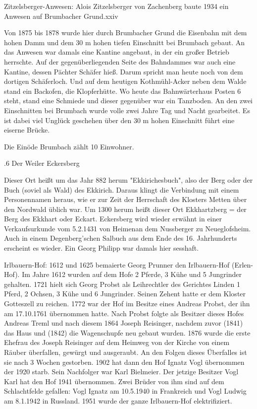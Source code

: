 Zitzelsberger-Anwesen: Alois Zitzelsberger von Zachenberg baute 1934 ein Anwesen
auf Brumbacher Grund.xxiv

Von 1875 bis 1878 wurde hier durch Brumbacher Grund die Eisenbahn mit dem hohen
Damm und dem 30 m hohen tiefen Einschnitt bei Brumbach gebaut. An das Anwesen
war damals eine Kantine angebaut, in der ein großer Betrieb herrschte. Auf der
gegenüberliegenden Seite des Bahndammes war auch eine Kantine, dessen Pächter
Schäfer hieß. Darum spricht man heute noch von dem dortigen Schäferloch. Und auf
dem heutigen Kothmühl-Acker neben dem Walde stand ein Backofen, die
Klopferhütte. Wo heute das Bahnwärterhaus Posten 6 steht, stand eine Schmiede
und dieser gegenüber war ein Tanzboden. An den zwei Einschnitten bei Brumbach
wurde volle zwei Jahre Tag und Nacht gearbeitet. Es ist dabei viel Unglück
geschehen über den 30 m hohen Einschnitt führt eine eiserne Brücke.

Die Einöde Brumbach zählt 10 Einwohner.

.6 Der Weiler Eckersberg

Dieser Ort heißt um das Jahr 882 herum "Ekkirichesbuch", also der Berg oder der
Buch (soviel als Wald) des Ekkirich. Daraus klingt die Verbindung mit einem
Personennamen heraus, wie er zur Zeit der Herrschaft des Klosters Metten über
den Nordwald üblich war. Um 1300 herum heißt dieser Ort Ekkhartzberg = der Berg
des Ekkhart oder Eckart. Eckersberg wird wieder erwähnt in einer Verkaufsurkunde
vom 5.2.1431 von Heimenan dem Nussberger zu Neueglofsheim. Auch in einem
Degenberg'schen Salbuch aus dem Ende des 16. Jahrhunderts erscheint es wieder.
Ein Georg Philipp war damals hier sesshaft.

Irlbauern-Hof: 1612 und 1625 bemaierte Georg Prunner den Irlbauern-Hof
(Erlen-Hof). Im Jahre 1612 wurden auf dem Hofe 2 Pferde, 3 Kühe und 5 Jungrinder
gehalten. 1721 hielt sich Georg Probst als Leihrechtler des Gerichtes Linden 1
Pferd, 2 Ochsen, 3 Kühe und 6 Jungrinder. Seinen Zehent hatte er dem Kloster
Gotteszell zu reichen. 1772 war der Hof im Besitze eines Andreas Probst, der ihn
am 17.10.1761 übernommen hatte. Nach Probst folgte als Besitzer dieses Hofes
Andreas Treml und nach diesem 1864 Joseph Reisinger, nachdem zuvor (1841) das
Haus und (1842) die Wagenschupfe neu gebaut wurden. 1876 wurde die erste Ehefrau
des Joseph Reisinger auf dem Heimweg von der Kirche von einem Räuber überfallen,
gewürgt und ausgeraubt. An den Folgen dieses Überfalles ist sie nach 3 Wochen
gestorben. 1902 hat dann den Hof Ignatz Vogl übernommen der 1920 starb. Sein
Nachfolger war Karl Bielmeier. Der jetzige Besitzer Vogl Karl hat den Hof 1941
übernommen. Zwei Brüder von ihm sind auf dem Schlachtfelde gefallen: Vogl Ignatz
am 10.5.1940 in Frankreich und Vogl Ludwig am 8.1.1942 in Russland. 1951 wurde
der ganze Irlbauern-Hof elektrifiziert.

